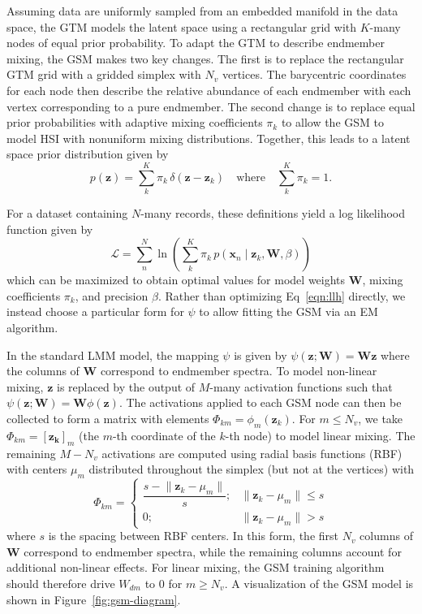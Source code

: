 Assuming data are uniformly sampled from an embedded manifold in the data space,
the GTM models the latent space using a rectangular grid with $K$-many nodes of
equal prior probability. To adapt the GTM to describe endmember mixing, the GSM
makes two key changes. The first is to replace the rectangular GTM grid with a
gridded simplex with $N_v$ vertices. The barycentric coordinates for each node
then describe the relative abundance of each endmember with each vertex
corresponding to a pure endmember. The second change is to replace equal prior
probabilities with adaptive mixing coefficients $\pi_k$ to allow the GSM to
model HSI with nonuniform mixing distributions. Together, this leads to a latent
space prior distribution given by
\begin{equation}\label{eqn:latent-distribution}
    p(\mathbf{z}) = \sum\limits_k^K \pi_k \, \delta(\mathbf{z} - \mathbf{z}_k) \quad\text{where}\quad  \sum_k^K\pi_k = 1.
\end{equation}

For a dataset containing $N$-many records, these definitions yield a log
likelihood function given by
\begin{equation}\label{eqn:llh}
    \mathscr{L} = \sum\limits_n^N \ln \left( \sum\limits_k^K \pi_k \, p(\mathbf{x}_n \mid \mathbf{z}_k, \mathbf{W}, \beta) \right)
\end{equation}
which can be maximized to obtain optimal values for model weights $\mathbf{W}$,
mixing coefficients $\pi_k$, and precision $\beta$. Rather than optimizing
Eq~\ref{eqn:llh} directly, we instead choose a particular form for $\psi$ to
allow fitting the GSM via an EM algorithm.

In the standard LMM model, the mapping $\psi$ is given by
$\psi(\mathbf{z};\mathbf{W}) = \mathbf{W}\mathbf{z}$ where the columns
of $\mathbf{W}$ correspond to endmember spectra. To model non-linear mixing, $\mathbf{z}$
is replaced by the output of $M$-many activation functions such that $\psi(\mathbf{z};\mathbf{W})
= \mathbf{W}\phi(\mathbf{z})$. The activations applied to each GSM node can then be
collected to form a matrix with elements $\Phi_{km} = \phi_m(\mathbf{z}_k)$. For $m \leq
N_v$, we take $\Phi_{km} = [\mathbf{z_{k}}]_m$ (the $m$-th coordinate of the $k$-th node) to
model linear mixing. The remaining  $M-N_v$ activations are computed using
radial basis functions (RBF) with centers $\mu_m$
distributed throughout the simplex (but not at the vertices) with
\begin{equation}\label{eq:act-function}
    \Phi_{km} = \begin{cases}
        \dfrac{s - \lVert \mathbf{z}_k - \mu_m \rVert}{s}; & \lVert \mathbf{z}_k - \mu_m \rVert \leq s \\
        0; & \lVert \mathbf{z}_k - \mu_m \rVert > s
    \end{cases}
\end{equation}
where $s$ is the spacing between RBF centers. In this form, the first $N_v$
columns of $\mathbf{W}$ correspond to endmember spectra, while the remaining
columns account for additional non-linear effects. For linear mixing, the GSM
training algorithm should therefore drive $W_{dm}$ to $0$ for $m\geq N_v$. A
visualization of the GSM model is shown in Figure~\ref{fig:gsm-diagram}.


